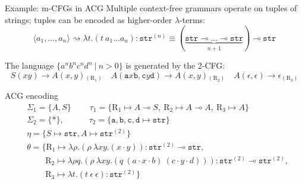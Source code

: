 \documentclass{beamer}
\newcommand{\term}[1]{\texttt{#1}}
\newcommand{\li}{\!\multimap\!}
\begin{document}
\begin{frame}{Example: m-CFGs in ACG}
	\small
	Multiple context-free grammars operate on \alert{tuples} of strings; tuples can be encoded as higher-order $\lambda$-terms:	
	\[
		\langle a_1, \dots, a_n \rangle \rightsquigarrow \lambda t.(t \ a_1 \dots a_n): \texttt{str}^{(n)}\equiv (\underbrace{\texttt{str} \li \dots \li \texttt{str}}_{n+1}) \li \texttt{str}
	\]

	The language $\{a^nb^nc^nd^n \ | \ n > 0 \}$ is generated by the 2-CFG:
	\[
		S(xy) \to A(x, y) {}_{(\mathrm{R}_1)} \quad A(\term{a}x\term{b}, \term{c}y\term{d}) \to A(x,y) {}_{(\mathrm{R}_2)} \quad A(\epsilon, \epsilon) \to \epsilon {}_{(\mathrm{R}_3)}
	\]	
	
	\alert{ACG encoding}
	\begin{align*}
	& \Sigma_1 = \{A, S\} \quad\quad \ \tau_1 = \{\mathrm{R}_1 \mapsto A\li S,\ \mathrm{R}_2 \mapsto A\li A,\ \mathrm{R}_3 \mapsto A \} \\
	& \Sigma_2 = \{*\}, \quad\quad\quad \tau_2 = \{\texttt{a}, \texttt{b}, \texttt{c}, \texttt{d} \mapsto \texttt{str} \}\\
	& \eta = \{S \mapsto \texttt{str}, A \mapsto \texttt{str}^{(2)} \} \\
	& \theta = \{\mathrm{R}_1 \mapsto \lambda \rho .\left( \rho\ \lambda xy.\left(x \cdot y\right) \right): \texttt{str}^{(2)} \li \texttt{str}, \\
	& \quad\quad \ \mathrm{R}_2 \mapsto \lambda \rho q. \left( \rho \ \lambda xy.\left( q \ \left( a \cdot x  \cdot b \right) \ \left( c\cdot y \cdot d \right) \right) \right): \texttt{str}^{(2)}\li \texttt{str}^{(2)},\\
	& \quad\quad \ \mathrm{R}_3 \mapsto \lambda t.(t\  \epsilon\ \epsilon): \texttt{str}^{(2)}
	\}
	\end{align*}
\end{frame}
\end{document}

